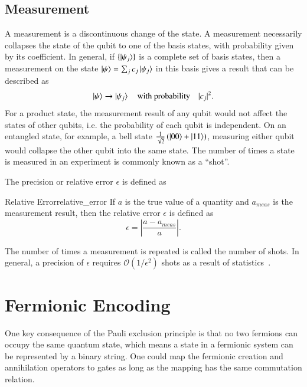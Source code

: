 \subsection{Measurement}
\label{sub:measurement}
A measurement is a discontinuous change of the state. A measurement necessarily collapses the state of the qubit to one of the basis states, with probability given by its coefficient. In general, if $  \{ \ket{\psi_j} \} $ is a complete set of basis states, then a measurement on the state $ \ket{\psi} = \sum_{j} c_j \ket{\psi_j} $ in this basis gives a result that can be described as
\begin{equation}
	\ket{\psi} \rightarrow \ket{\psi_j} \quad \text{with probability} \quad |c_j|^2.
\end{equation}
For a product state, the measurement result of any qubit would not affect the states of other qubits, i.e. the probability of each qubit is independent. On an entangled state, for example, a bell state $ \frac{1}{\sqrt{2}} \left( \ket{00} + \ket{11} \right) $, measuring either qubit would collapse the other qubit into the same state. 
The number of times a state is measured in an experiment is commonly known as a ``shot''.

The precision or relative error $ \epsilon $ is defined as 
\begin{definition}{Relative Error}{relative_error}
	If $ a $ is the true value of a quantity and $ a_{meas} $ is the measurement result, then the relative error $ \epsilon $ is defined as 
\begin{equation}
	\label{eq:rel_err}
	\epsilon = \left| \frac{a-a_{meas}}{a} \right|.
\end{equation}
\end{definition}

The number of times a measurement is repeated is called the number of shots. In general, a precision of $ \epsilon $ requires $ \mathcal{O}(1/\epsilon^2) $ shots as a result of statistics~\cite{knill2007}.

\section{Fermionic Encoding}
One key consequence of the Pauli exclusion principle is that no two fermions can occupy the same quantum state, which means a state in a fermionic system can be represented by a binary string. One could map the fermionic creation and annihilation operators to gates as long as the mapping has the same commutation relation.

